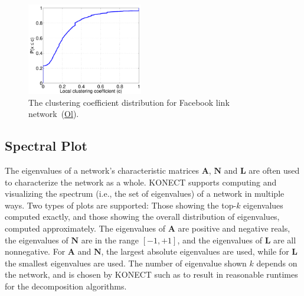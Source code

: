\documentclass{article}
\newcommand{\wPlot}{0.45\textwidth}
\begin{document}
\begin{figure}
  \centering
  \includegraphics[width=\wPlot]{plot/cluscod.a.facebook-wosn-links}
  \caption{ The clustering coefficient distribution for Facebook link
    network~(\href{http://konect.uni-koblenz.de/networks/facebook-wosn-links}{\textsf{Ol}}).
  }
\end{figure}

\subsection{Spectral Plot}
The eigenvalues of a network's characteristic matrices $\mathbf A$,
$\mathbf N$ and $\mathbf L$ are often used to characterize the network
as a whole.  KONECT supports computing and visualizing the spectrum
(i.e., the set of eigenvalues) of a network in multiple ways.  Two types
of plots are supported: Those showing the top-$k$ eigenvalues computed
exactly, and those showing the overall distribution of eigenvalues,
computed approximately. The eigenvalues of $\mathbf A$ are positive and
negative reals, the eigenvalues of $\mathbf N$ are in the range
$[-1,+1]$, and the eigenvalues of $\mathbf L$ are all nonnegative.  For
$\mathbf A$ and $\mathbf N$, the largest absolute eigenvalues are used,
while for $\mathbf L$ the smallest eigenvalues are used.  The number of
eigenvalue shown $k$ depends on the network, and is chosen by KONECT
such as to result in reasonable runtimes for the decomposition
algorithms.
\end{document}
